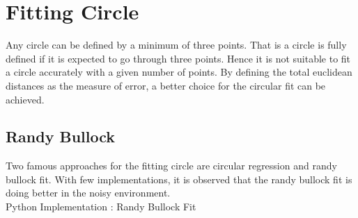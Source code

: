 \section{Fitting Circle}
Any circle can be defined by a minimum of three points. That is a circle is fully defined if it is expected to go through three points. Hence it is not suitable to fit a circle accurately with a given number of points.  By defining the total euclidean distances as the measure of error, a better choice for the circular fit can be achieved. 

 
\subsection*{Randy Bullock}
Two famous approaches for the fitting circle are circular regression and randy bullock fit. With few implementations, it is observed that the randy bullock fit is doing better in the noisy environment. \\
{\color{cyan} Python Implementation : Randy Bullock Fit}
